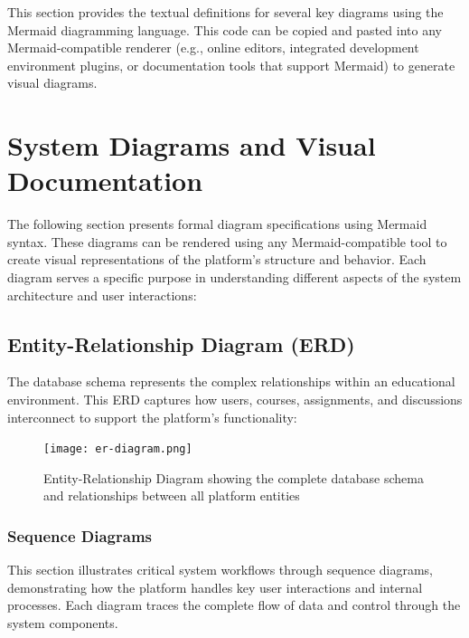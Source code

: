 \documentclass[12pt,a4paper]{article}
\begin{document}
This section provides the textual definitions for several key diagrams using the Mermaid diagramming language. This code can be copied and pasted into any Mermaid-compatible renderer (e.g., online editors, integrated development environment plugins, or documentation tools that support Mermaid) to generate visual diagrams.

\section{System Diagrams and Visual Documentation}

The following section presents formal diagram specifications using Mermaid syntax. These diagrams can be rendered using any Mermaid-compatible tool to create visual representations of the platform's structure and behavior. Each diagram serves a specific purpose in understanding different aspects of the system architecture and user interactions:

\subsection{Entity-Relationship Diagram (ERD)}

The database schema represents the complex relationships within an educational environment. This ERD captures how users, courses, assignments, and discussions interconnect to support the platform's functionality:

\begin{figure}[!htbp]
    \centering
    \texttt{[image: er-diagram.png]}
    \caption{Entity-Relationship Diagram showing the complete database schema and relationships between all platform entities}
    \label{fig:er-diagram}
\end{figure}
\FloatBarrier

\subsubsection{Sequence Diagrams}
This section illustrates critical system workflows through sequence diagrams, demonstrating how the platform handles key user interactions and internal processes. Each diagram traces the complete flow of data and control through the system components.
\end{document}
